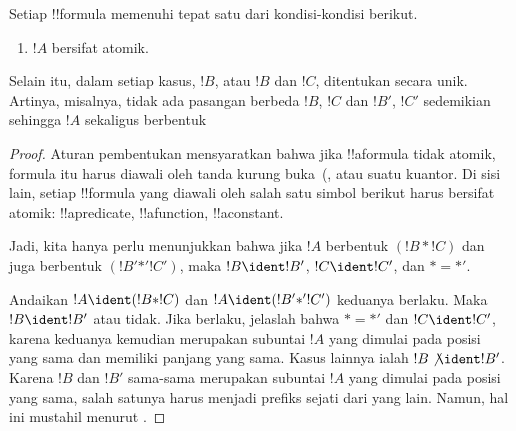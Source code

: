 \documentclass[../../../include/open-logic-section]{subfiles}
\begin{document}
\begin{prop}
Setiap !!{formula} memenuhi tepat satu dari kondisi-kondisi berikut.
\begin{enumerate}
\item $!A$ bersifat atomik.







\end{enumerate}
Selain itu, dalam setiap kasus, $!B$, atau $!B$ dan $!C$, ditentukan secara
unik. Artinya, misalnya, tidak ada pasangan berbeda $!B$, $!C$ dan $!B'$,
$!C'$ sedemikian sehingga $!A$ sekaligus berbentuk
\end{prop}

\begin{proof}
Aturan pembentukan mensyaratkan bahwa jika !!a{formula} tidak atomik,
formula itu harus diawali oleh tanda kurung buka~(,
 atau suatu kuantor. Di sisi lain, setiap
!!{formula} yang diawali oleh salah satu simbol berikut harus bersifat
atomik: !!a{predicate}, !!a{function},
!!a{constant}.

Jadi, kita hanya perlu menunjukkan bahwa jika $!A$ berbentuk $(!B \ast
!C)$ dan juga berbentuk $(!B' \mathbin{\ast'} !C')$, maka $!B \ident !B'$,
$!C \ident !C'$, dan $\ast = {\ast'}$.

Andaikan $!A \ident (!B \ast !C)$ dan $!A \ident (!B'
\mathbin{\ast'} !C')$ keduanya berlaku. Maka $!B \ident !B'$ atau tidak.
Jika berlaku, jelaslah bahwa $\ast = {\ast'}$ dan $!C \ident !C'$, karena
keduanya kemudian merupakan subuntai $!A$ yang dimulai pada posisi yang sama
dan memiliki panjang yang sama. Kasus lainnya ialah $!B \not\ident !B'$.
Karena $!B$ dan $!B'$ sama-sama merupakan subuntai $!A$ yang dimulai pada
posisi yang sama, salah satunya harus menjadi prefiks sejati dari yang lain.
Namun, hal ini mustahil menurut .
\end{proof}
\end{document}
